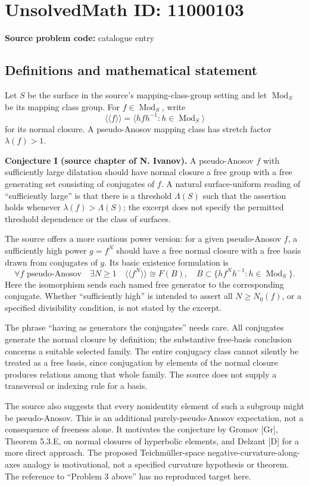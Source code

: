 \documentclass[11pt]{article}
\begin{document}
\section*{UnsolvedMath ID: 11000103}
\textbf{Source problem code:} catalogue entry
\subsection{Definitions and mathematical statement}
Let $S$ be the surface in the source's mapping-class-group setting and let $\operatorname{Mod}_S$ be its mapping class group. For $f\in\operatorname{Mod}_S$, write
\[
 \langle\!\langle f\rangle\!\rangle=\langle hfh^{-1}:h\in\operatorname{Mod}_S\rangle
\]
for its normal closure. A pseudo-Anosov mapping class has stretch factor $\lambda(f)>1$.

\textbf{Conjecture I (source chapter of N. Ivanov).} A pseudo-Anosov $f$ with sufficiently large dilatation should have normal closure a free group with a free generating set consisting of conjugates of $f$. A natural surface-uniform reading of ``sufficiently large'' is that there is a threshold $\Lambda(S)$ such that the assertion holds whenever $\lambda(f)>\Lambda(S)$; the excerpt does not specify the permitted threshold dependence or the class of surfaces.

The source offers a more cautious power version: for a given pseudo-Anosov $f$, a sufficiently high power $g=f^N$ should have a free normal closure with a free basis drawn from conjugates of $g$. Its basic existence formulation is
\[
 \forall f\text{ pseudo-Anosov}\quad\exists N\ge1\quad
 \langle\!\langle f^N\rangle\!\rangle\cong F(B),
 \quad B\subset\{hf^Nh^{-1}:h\in\operatorname{Mod}_S\}.
\]
Here the isomorphism sends each named free generator to the corresponding conjugate. Whether ``sufficiently high'' is intended to assert all $N\ge N_0(f)$, or a specified divisibility condition, is not stated by the excerpt.

The phrase ``having as generators the conjugates'' needs care. All conjugates generate the normal closure by definition; the substantive free-basis conclusion concerns a suitable selected family. The entire conjugacy class cannot silently be treated as a free basis, since conjugation by elements of the normal closure produces relations among that whole family. The source does not supply a transversal or indexing rule for a basis.

The source also suggests that every nonidentity element of such a subgroup might be pseudo-Anosov. This is an additional purely-pseudo-Anosov expectation, not a consequence of freeness alone. It motivates the conjecture by Gromov [Gr], Theorem 5.3.E, on normal closures of hyperbolic elements, and Delzant [D] for a more direct approach. The proposed Teichm\"uller-space negative-curvature-along-axes analogy is motivational, not a specified curvature hypothesis or theorem. The reference to ``Problem 3 above'' has no reproduced target here.
\end{document}
